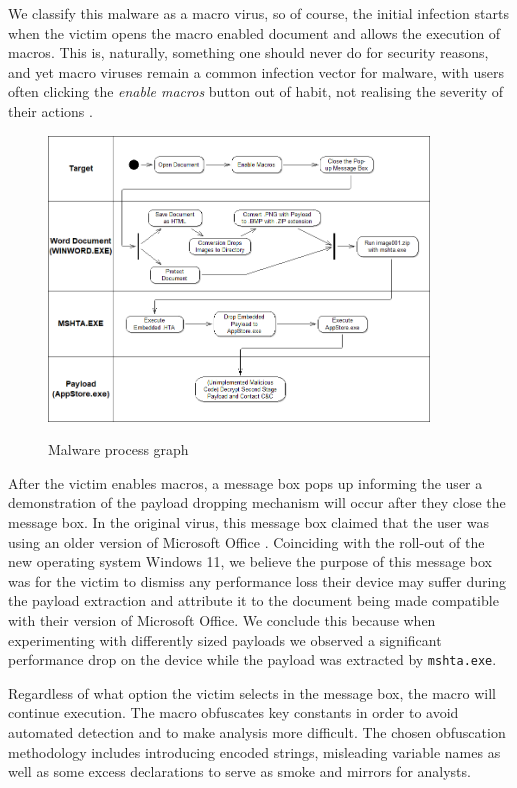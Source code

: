 We classify this malware as a macro virus, so of course, the initial infection starts when the victim opens the macro
enabled document and allows the execution of macros. This is, naturally, something one should never do for security
reasons, and yet macro viruses remain a common infection vector for malware, with users often clicking the \emph{enable
macros} button out of habit, not realising the severity of their actions \cite{macro-viruses-users}.

\begin{figure}[H]
  \centering
  \includegraphics[width=0.9\textwidth]{figures/malware-process-graph.png}
  \label{process-graph}
  \caption{Malware process graph}
\end{figure}

After the victim enables macros, a message box pops up informing the user a demonstration of the payload dropping
mechanism will occur after they close the message box. In the original virus, this message box claimed that the user 
was using an older version of Microsoft Office \cite{jazi-article}. Coinciding with the roll-out of the new operating 
system Windows 11, we believe the purpose of this message box was for the victim to dismiss any performance loss their 
device may suffer during the payload extraction and attribute it to the document being made compatible with their version 
of Microsoft Office. 
We conclude this because when experimenting with differently sized payloads we observed a significant performance drop
on the device while the payload was extracted by \verb+mshta.exe+.

Regardless of what option the victim selects in the message box, the macro will continue execution. The macro obfuscates
key constants in order to avoid automated detection and to make analysis more difficult. The chosen obfuscation
methodology includes introducing encoded strings, misleading variable names as well as some excess declarations to 
serve as smoke and mirrors for analysts.

